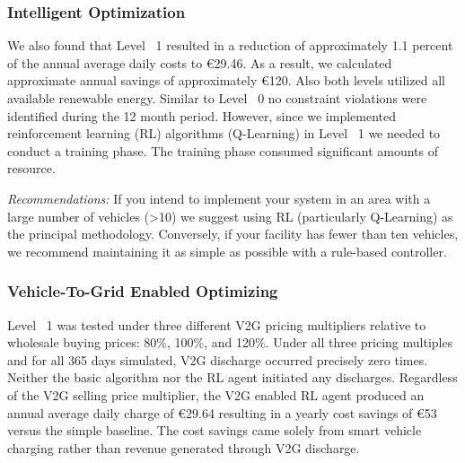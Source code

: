 \subsubsection{Intelligent Optimization} 
\label{subsubsec:intelligent_optimization}

We also found that Level ~1 resulted in a reduction of approximately 1.1 percent of the annual average daily costs to €29.46. As a result, we calculated approximate annual savings of approximately €120. Also both levels utilized all available renewable energy. Similar to Level ~0 no constraint violations were identified during the 12 month period. However, since we implemented reinforcement learning (RL) algorithms (Q-Learning) in Level ~1 we needed to conduct a training phase. The training phase consumed significant amounts of resource.

\emph{Recommendations:} If you intend to implement your system in an area with a large number of vehicles (>10) we suggest using RL (particularly Q-Learning) as the principal methodology. Conversely, if your facility has fewer than ten vehicles, we recommend maintaining it as simple as possible with a rule-based controller.

\subsubsection{Vehicle-To-Grid Enabled Optimizing} 
\label{subsubsec:v2g_enabled_optimizing}

Level ~1 was tested under three different V2G pricing multipliers relative to wholesale buying prices: 80\%, 100\%, and 120\%. Under all three pricing multiples and for all 365 days simulated, V2G discharge occurred precisely zero times. Neither the basic algorithm nor the RL agent initiated any discharges. Regardless of the V2G selling price multiplier, the V2G enabled RL agent produced an annual average daily charge of €29.64 resulting in a yearly cost savings of €53 versus the simple baseline. The cost savings came solely from smart vehicle charging rather than revenue generated through V2G discharge.

